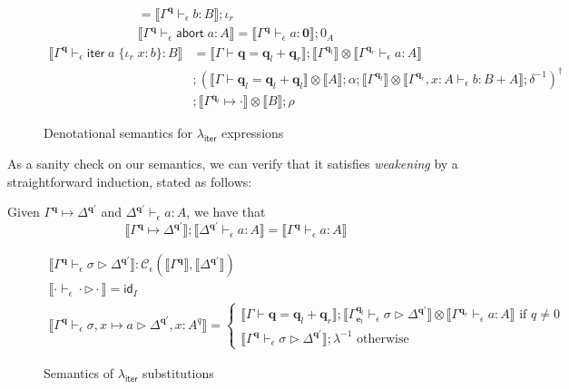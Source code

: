 \documentclass[acmsmall,screen,review]{acmart}
\newcommand{\mc}[1]{\ensuremath{\mathcal{#1}}}
\newcommand{\mb}[1]{\ensuremath{\mathbf{#1}}}
\newcommand{\ms}[1]{\ensuremath{\mathsf{#1}}}
\newcommand{\lto}{:}
\newcommand{\linr}[1]{\iota_r\;{#1}}
\newcommand{\labort}[1]{\ms{abort}\;{#1}}
\newcommand{\liter}[3]{\ms{iter}\;#1\;\{ \linr{#2} \lto #3 \}}
\newcommand{\qsp}[4]{#1 \vdash #2 = #3 + #4}
\newcommand{\cwk}[2]{#1 \mapsto #2}
\newcommand{\hasty}[4]{#1 \vdash_{#2} #3: {#4}}
\newcommand{\issubst}[4]{#1 \vdash_{#2} #3 \rhd #4}
\newcommand{\dnt}[1]{\llbracket{#1}\rrbracket}
\newcommand{\subiterexp}{\texorpdfstring{\(\lambda_{\ms{iter}}\)}{lambda-iter}}
\begin{document}
\begin{figure}
\begin{gather*}
    = \dnt{\hasty{\Gamma^{\mb{q}}}{\epsilon}{b}{B}} ; \iota_r \\
    \dnt{\hasty{\Gamma^{\mb{q}}}{\epsilon}{\labort{a}}{A}}
    = \dnt{\hasty{\Gamma^{\mb{q}}}{\epsilon}{a}{\mb{0}}} ; 0_A
  \end{gather*}
  \begin{align*}
    \dnt{\hasty{\Gamma^{\mb{q}}}{\epsilon}{\liter{a}{x}{b}}{B}}
    &= 
    \dnt{\qsp{\Gamma}{\mb{q}}{\mb{q}_l}{\mb{q}_r}}
    ; \dnt{\Gamma^{\mb{q}_l}}
      \otimes \dnt{\hasty{\Gamma^{\mb{q}_r}}{\epsilon}{a}{A}} \\ &
    ; (
      \dnt{\qsp{\Gamma}{\mb{q}_l}{\mb{q}_l}{\mb{q}_l}} \otimes \dnt{A} 
      ; \alpha
      ; \dnt{\Gamma^{\mb{q}_l}} 
        \otimes \dnt{\hasty{\Gamma^{\mb{q}_r}, x : A}{\epsilon}{b}{B + A}}
      ; \delta^{-1}
    )^\dagger \\ &
    ; \dnt{\cwk{\Gamma^{\mb{q}_l}}{\cdot}} \otimes \dnt{B}
    ; \rho
  \end{align*}
  \caption{Denotational semantics for \subiterexp{} expressions}
  \Description{}
  \label{fig:expr-densem}
\end{figure}

As a sanity check on our semantics, we can verify that it satisfies \emph{weakening} by a
straightforward induction, stated as follows:
\begin{lemma}[Weakening]
  Given $\cwk{\Gamma^{\mb{q}}}{\Delta^{\mb{q}'}}$ and
  $\hasty{\Delta^{\mb{q}'}}{\epsilon}{a}{A}$, we have that
  $$
  \dnt{\cwk{\Gamma^{\mb{q}}}{\Delta^{\mb{q}'}}} ; \dnt{\hasty{\Delta^{\mb{q}'}}{\epsilon}{a}{A}}
  = \dnt{\hasty{\Gamma^{\mb{q}}}{\epsilon}{a}{A}}
  $$
\end{lemma}

\begin{figure}
  \begin{gather*}
    \boxed{\dnt{\issubst{\Gamma^{\mb{q}}}{\epsilon}{\sigma}{\Delta^{\mb{q}'}}}
      : \mc{C}_\epsilon(\dnt{\Gamma^{\mb{q}}}, \dnt{\Delta^{\mb{q}'}})} \\
    \dnt{\issubst{\cdot}{\epsilon}{\cdot}{\cdot}} = \ms{id}_I
    \\
    \dnt{\issubst{\Gamma^{\mb{q}}}{\epsilon}{\sigma, x \mapsto a}{\Delta^{\mb{q}'}, x : A^q}}
    = \begin{cases}
      \dnt{\qsp{\Gamma}{\mb{q}}{\mb{q}_l}{\mb{q}_r}} 
      ; \dnt{\issubst{\Gamma^{\mb{q}_l}_{\mb{e}_l}}{\epsilon}{\sigma}{\Delta^{\mb{q}'}}}
      \otimes \dnt{\hasty{\Gamma^{\mb{q}_r}}{\epsilon}{a}{A}}
      \text{ if } q \neq 0 \\
      \dnt{\issubst{\Gamma^{\mb{q}}}{\epsilon}{\sigma}{\Delta^{\mb{q}'}}}
      ; \lambda^{-1} \text{ otherwise}
    \end{cases}
  \end{gather*}
  \caption{Semantics of \subiterexp{} substitutions}
  \Description{}
  \label{fig:subst-den}
\end{figure}
\end{document}
